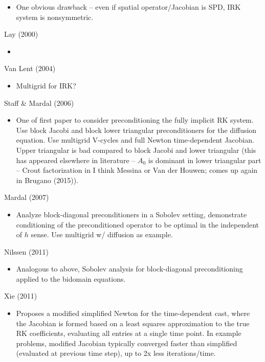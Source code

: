 \documentclass[review]{siamart}
\begin{document}
\begin{itemize}
	\item One obvious drawback -- even if spatial operator/Jacobian is SPD, IRK system is
	nonsymmetric.
\end{itemize}

Lay (2000)
\begin{itemize}
	\item 
\end{itemize}

Van Lent (2004)
\begin{itemize}
	\item Multigrid for IRK?
\end{itemize}

Staff \& Mardal (2006)
\begin{itemize}
	\item One of first paper to consider preconditioning the fully implicit RK system.
	Use block Jacobi and block lower triangular preconditioners for the diffusion equation.
	Use multigrid V-cycles and full Newton time-dependent Jacobian. Upper triangular is
	bad compared to block Jacobi and lower triangular (this has appeared elsewhere in
	literature -- $A_0$ is dominant in lower triangular part -- Crout factorization
	in I think Messina or Van der Houwen; comes up again in Brugano (2015)).
\end{itemize}
Mardal (2007)
\begin{itemize}
	\item Analyze block-diagonal preconditioners in a Sobolev setting, demonstrate
	conditioning of the preconditioned operator to be optimal in the independent of
	$h$ sense. Use multigrid w/ diffusion as example. 
\end{itemize}
Nilssen (2011)
\begin{itemize}
	\item Analogous to above, Sobolev analysis for block-diagonal preconditioning
	applied to the bidomain equations.
\end{itemize}

Xie (2011)
\begin{itemize}
	\item Proposes a modified simplified Newton for the time-dependent cast, where the Jacobian is
	formed based on a least squares approximation to the true RK coefficients, evaluating all entries
	at a single time point. In example problems, modified Jacobian typically converged faster
	than simplified (evaluated at previous time step), up to 2x less iterations/time. 
\end{itemize}
\end{document}
